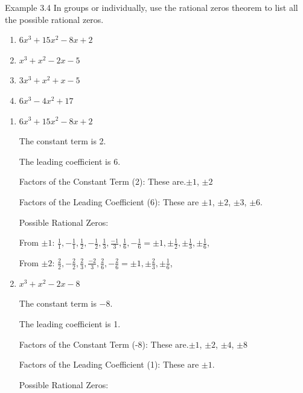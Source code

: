 \begin{example}{Example 3.4}
In groups or individually, use the rational zeros theorem to list all the possible
rational zeros.
\begin{enumerate}
  \item[a.] $6x^3 + 15x^2 - 8x + 2$
  \item[b.] $x^3 + x^2 - 2x - 5$
  \item[c.] $3x^3 + x^2 + x - 5$
  \item[d.] $6x^3 - 4x^2 + 17$
\end{enumerate}

\solution
\begin{enumerate}
  \item[a.] $6x^3 + 15x^2 - 8x + 2$

  The constant term is 2.

  The leading coefficient is 6.

  Factors of the Constant Term (2): These are.$\pm 1$, $\pm 2$

  Factors of the Leading Coefficient (6): These are $\pm 1$, $\pm 2$, $\pm 3$, $\pm 6$.

  Possible Rational Zeros:

  From $\pm 1$: $\frac{1}{1}, -\frac{1}{1}, \frac{1}{2}, -\frac{1}{2}, \frac{1}{3},
  \frac{-1}{3}, \frac{1}{6}, -\frac{1}{6} = \pm 1, \pm\frac{1}{2}, \pm\frac{1}{3},
  \pm\frac{1}{6}$,

  From $\pm 2$: $\frac{2}{2}, -\frac{2}{2}, \frac{2}{3}, \frac{-2}{3}, \frac{2}{6},
  -\frac{2}{6} = \pm 1, \pm\frac{2}{3}, \pm\frac{1}{6}$,

  \item[b.] $x^3 + x^2 - 2x - 8$

  The constant term is $-8$.

  The leading coefficient is 1.

  Factors of the Constant Term (-8): These are.$\pm 1$, $\pm 2$, $\pm 4$, $\pm 8$

  Factors of the Leading Coefficient (1): These are $\pm 1$.

  Possible Rational Zeros:


\end{enumerate}
\end{example}
